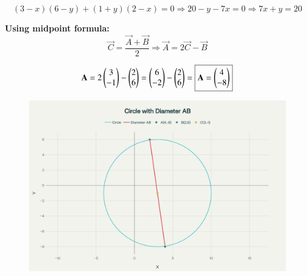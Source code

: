 \documentclass[journal]{IEEEtran}
\begin{document}
\[
(3 - x)(6 - y) + (1 + y)(2 - x) = 0
\Rightarrow 20 - y - 7x = 0 \Rightarrow \boxed{7x + y = 20}
\]

\bigskip

\textbf{Using midpoint formula:}
\[
\vec{C} = \frac{\vec{A} + \vec{B}}{2} \Rightarrow \vec{A} = 2\vec{C} - \vec{B}
\]

\[
\mathbf{A} = 2\begin{pmatrix}3\\-1\end{pmatrix} - \begin{pmatrix}2\\6\end{pmatrix} = \begin{pmatrix}6\\-2\end{pmatrix} - \begin{pmatrix}2\\6\end{pmatrix} = \boxed{\mathbf{A} = \begin{pmatrix}4\\-8\end{pmatrix}}
\]

\begin{figure}[H]
    \centering
    \includegraphics[width=0.5\linewidth]{figs/fig.png}
    \caption{}
    \label{fig:placeholder}
\end{figure}
\end{document}
